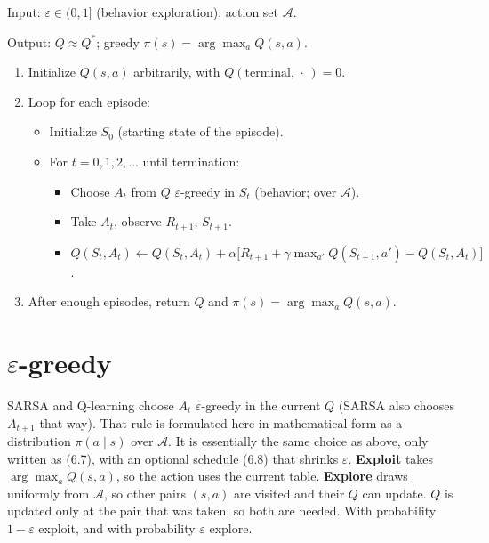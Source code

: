 \begin{implnote}
Input: $\varepsilon\in(0,1]$ (behavior exploration); action set $\mathcal{A}$.

Output: $Q\approx Q^*$; greedy $\pi(s)=\arg\max_a Q(s,a)$.

\begin{enumerate}
\item Initialize $Q(s,a)$ arbitrarily, with $Q(\text{terminal},\,\cdot\,)=0$.
\item Loop for each episode:
\begin{itemize}
\item Initialize $S_0$ (starting state of the episode).
\item For $t=0,1,2,\ldots$ until termination:
\begin{itemize}
\item Choose $A_t$ from $Q$ $\varepsilon$-greedy in $S_t$ (behavior; over $\mathcal{A}$).
\item Take $A_t$, observe $R_{t+1}$, $S_{t+1}$.
\item $Q(S_t,A_t)\leftarrow Q(S_t,A_t)+\alpha\bigl[R_{t+1}+\gamma\max_{a'} Q(S_{t+1},a')-Q(S_t,A_t)\bigr]$.
\end{itemize}
\end{itemize}
\item After enough episodes, return $Q$ and $\pi(s)=\arg\max_a Q(s,a)$.
\end{enumerate}

\end{implnote}




\section{$\varepsilon$-greedy}

SARSA and Q-learning choose $A_t$ $\varepsilon$-greedy in the current $Q$ (SARSA also chooses $A_{t+1}$ that way). That rule is formulated here in mathematical form as a distribution $\pi(a\mid s)$ over $\mathcal{A}$. It is essentially the same choice as above, only written as (6.7), with an optional schedule (6.8) that shrinks $\varepsilon$. \textbf{Exploit} takes $\arg\max_a Q(s,a)$, so the action uses the current table. \textbf{Explore} draws uniformly from $\mathcal{A}$, so other pairs $(s,a)$ are visited and their $Q$ can update. $Q$ is updated only at the pair that was taken, so both are needed. With probability $1-\varepsilon$ exploit, and with probability $\varepsilon$ explore.

